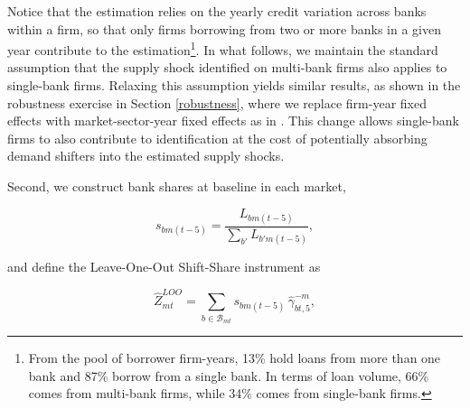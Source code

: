 \documentclass[12pt]{article}
\begin{document}
Notice that the estimation relies on the yearly credit variation across banks within a firm, so that only firms borrowing from two or more banks in a given year contribute to the estimation\footnote{From the pool of borrower firm-years, 13\% hold loans from more than one bank and 87\% borrow from a single bank. In terms of loan volume, 66\% comes from multi-bank firms, while 34\% comes from single-bank firms.}. In what follows, we maintain the standard assumption that the supply shock identified on multi-bank firms also applies to single-bank firms. Relaxing this assumption yields similar results, as shown in the robustness exercise in Section \ref{robustness}, where we replace firm-year fixed effects with market-sector-year fixed effects as in \citet{degryse2019identifying}. This change allows single-bank firms to also contribute to identification at the cost of potentially absorbing demand shifters into the estimated supply shocks.

Second, we construct bank shares at baseline in each market, 

\begin{equation}
    s_{bm(t-5)} = \frac{L_{bm(t-5)}}{\sum_{b'} L_{b'm(t-5)}},
\end{equation}

and define the Leave-One-Out Shift-Share instrument as

\begin{equation}
    \hat{Z}_{mt}^{LOO} = \sum_{b \in \mathcal{B}_{mt}} s_{bm(t-5)}\, \hat{\gamma}_{bt,5}^{-m},
\end{equation}
\end{document}

